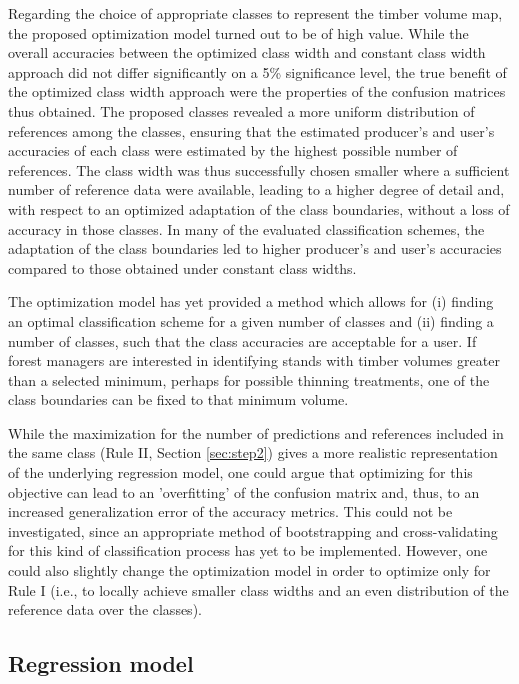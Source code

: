 Regarding the choice of appropriate classes to represent the timber volume map, the proposed optimization model turned out to be of high value. While the overall accuracies between the optimized class width and constant class width approach did not differ significantly on a 5\% significance level, the true benefit of the optimized class width approach were the properties of the confusion matrices thus obtained. The proposed classes revealed a more uniform distribution of references among the classes, ensuring that the estimated producer's and user's accuracies of each class were estimated by the highest possible number of references. The class width was thus successfully chosen smaller where a sufficient number of reference data were available, leading to a higher degree of detail and, with respect to an optimized adaptation of the class boundaries, without a loss of accuracy in those classes. In many of the evaluated classification schemes, the adaptation of the class boundaries led to higher producer's and user's accuracies compared to those obtained under constant class widths.\par
The optimization model has yet provided a method which allows for (i) finding an optimal classification scheme for a given number of classes and (ii) finding a number of classes, such that the class accuracies are acceptable for a user. If forest managers are interested in identifying stands with timber volumes greater than a selected minimum, perhaps for possible thinning treatments, one of the class boundaries can be fixed to that minimum volume.\par
While the maximization for the number of predictions and references included in the same class (Rule II, Section \ref{sec:step2}) gives a more realistic representation of the underlying regression model, one could argue that optimizing for this objective can lead to an 'overfitting' of the confusion matrix and, thus, to an increased generalization error of the accuracy metrics. This could not be investigated, since an appropriate method of bootstrapping and cross-validating for this kind of classification process has yet to be implemented. However, one could also slightly change the optimization model in order to optimize only for Rule I (i.e., to locally achieve smaller class widths and an even distribution of the reference data over the classes).

\subsection{Regression model}
\label{sec:regmod}

